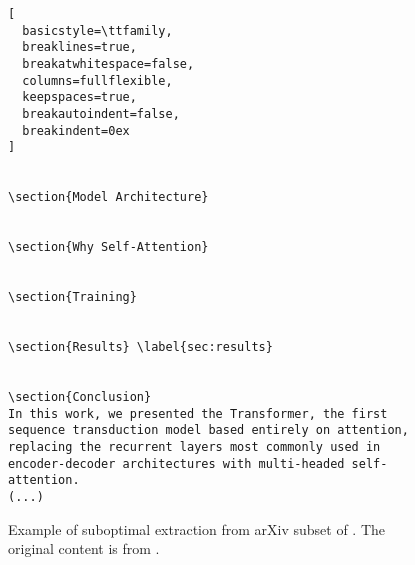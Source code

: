 \begin{figure}[h]
\begin{tcolorbox}[colframe=black!80!white, colback=black!2!white, boxrule=0.5mm, width=\textwidth, arc=2mm, auto outer arc, title=Example of suboptimal extraction from arXiv, fonttitle=\color{white}\bfseries]
\begin{lstlisting}[
  basicstyle=\ttfamily,
  breaklines=true,
  breakatwhitespace=false,
  columns=fullflexible,
  keepspaces=true,
  breakautoindent=false,
  breakindent=0ex
]


\section{Model Architecture}


\section{Why Self-Attention}


\section{Training}


\section{Results} \label{sec:results}


\section{Conclusion}
In this work, we presented the Transformer, the first sequence transduction model based entirely on attention, replacing the recurrent layers most commonly used in encoder-decoder architectures with multi-headed self-attention.
(...)
\end{lstlisting}
\end{tcolorbox}
\caption{
    Example of suboptimal extraction from arXiv subset of \citet{redpajama}. 
    The original content is from \citet{Vaswani+2017}.
}
\end{figure}

